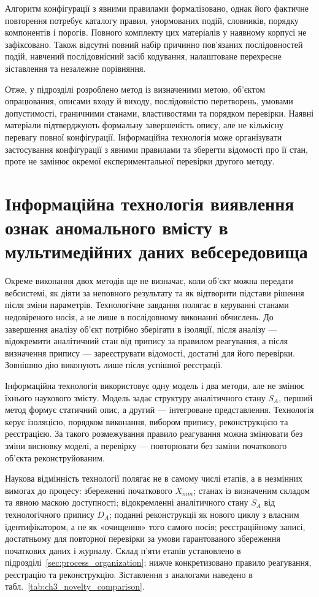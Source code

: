 Алгоритм конфігурації з явними правилами формалізовано, однак його фактичне повторення потребує каталогу правил, унормованих подій, словників, порядку компонентів і порогів. Повного комплекту цих матеріалів у наявному корпусі не зафіксовано. Також відсутні повний набір причинно пов’язаних послідовностей подій, навчений послідовнісний засіб кодування, налаштоване перехресне зіставлення та незалежне порівняння.

Отже, у підрозділі розроблено метод із визначеними метою, об’єктом опрацювання, описами входу й виходу, послідовністю перетворень, умовами допустимості, граничними станами, властивостями та порядком перевірки. Наявні матеріали підтверджують формальну завершеність опису, але не кількісну перевагу повної конфігурації. Інформаційна технологія може організувати застосування конфігурації з явними правилами та зберегти відомості про її стан, проте не замінює окремої експериментальної перевірки другого методу.

\section{Інформаційна технологія виявлення ознак аномального вмісту в мультимедійних даних вебсередовища}
\label{sec:information_technology}

Окреме виконання двох методів ще не визначає, коли об’єкт можна передати вебсистемі, як діяти за неповного результату та як відтворити підстави рішення після зміни параметрів. Технологічне завдання полягає в керуванні станами недовіреного носія, а не лише в послідовному виконанні обчислень. До завершення аналізу об’єкт потрібно зберігати в ізоляції, після аналізу --- відокремити аналітичний стан від припису за правилом реагування, а після визначення припису --- зареєструвати відомості, достатні для його перевірки. Зовнішню дію виконують лише після успішної реєстрації.

Інформаційна технологія використовує одну модель і два методи, але не змінює їхнього наукового змісту. Модель задає структуру аналітичного стану $S_A$, перший метод формує статичний опис, а другий --- інтегроване представлення. Технологія керує ізоляцією, порядком виконання, вибором припису, реконструкцією та реєстрацією. За такого розмежування правило реагування можна змінювати без зміни висновку моделі, а перевірку --- повторювати без заміни початкового об’єкта реконструйованим.

Наукова відмінність технології полягає не в самому числі етапів, а в незмінних вимогах до процесу: збереженні початкового $X_{mm}$; станах із визначеним складом та явною маскою доступності; відокремленні аналітичного стану $S_A$ від технологічного припису $D_A$; поданні реконструкції як нового циклу з власним ідентифікатором, а не як «очищення» того самого носія; реєстраційному записі, достатньому для повторної перевірки за умови гарантованого збереження початкових даних і журналу. Склад п’яти етапів установлено в підрозділі~\ref{sec:process_organization}; нижче конкретизовано правило реагування, реєстрацію та реконструкцію. Зіставлення з аналогами наведено в табл.~\ref{tab:ch3_novelty_comparison}.

